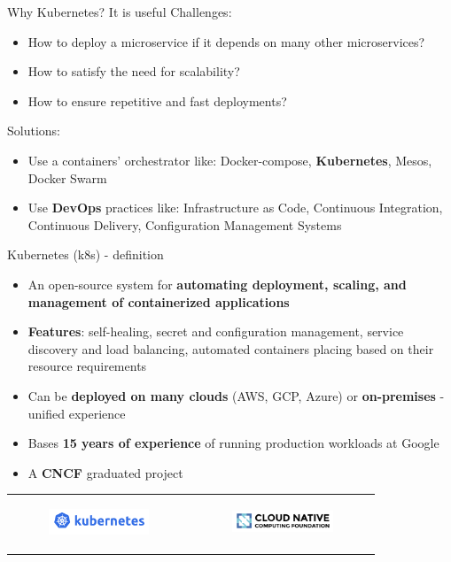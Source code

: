\documentclass{beamer}
\begin{document}
\begin{frame}{Why Kubernetes? It is useful}%
Challenges:
\begin{itemize}
	\item How to deploy a microservice if it depends on many other microservices?
	\item How to satisfy the need for scalability?
	\item How to ensure repetitive and fast deployments?
\end{itemize}

Solutions:
\begin{itemize}
	\item Use a containers' orchestrator like: Docker-compose, \textbf{Kubernetes}, Mesos, Docker Swarm
	\item Use \textbf{DevOps} practices like: Infrastructure as Code, Continuous Integration, Continuous Delivery, Configuration Management Systems
\end{itemize}
\end{frame}

\begin{frame}{Kubernetes (k8s) - definition}%
\begin{itemize}
\item An open-source system for \textbf{automating deployment, scaling, and management of containerized applications}
\item \textbf{Features}: self-healing, secret and configuration management, service discovery and load balancing, automated containers placing based on their resource requirements
\item Can be \textbf{deployed on many clouds} (AWS, GCP, Azure) or \textbf{on-premises} - unified experience
\item Bases \textbf{15 years of experience} of running production workloads at Google
\item A \textbf{CNCF} graduated project
\end{itemize}

\begin{tabular}{  c c }
	\begin{figure}
		\includegraphics[width=3cm]{figures/kubernetes-logo.png}
		\label{fig:kubernetes-logo}
	\end{figure} &
	\begin{figure}
		\includegraphics[width=3cm]{figures/cncf-logo.png}
		\label{fig:cncf-logo}
	\end{figure} 
\end{tabular}
\end{frame}
\end{document}
